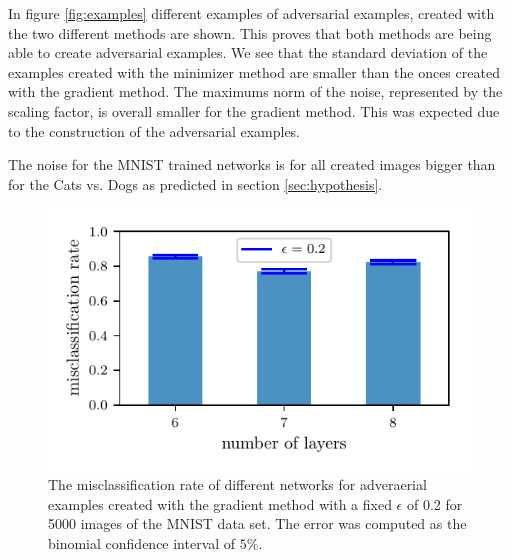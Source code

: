 \documentclass[%
 reprint,
 amsmath,amssymb,
 aps,
]{revtex4-1}
\begin{document}
In figure \ref{fig:examples} different examples of adversarial examples, created with the two different methods are shown. This proves that both methods are being able to create adversarial examples. We see that the standard deviation of the examples created with the minimizer method are smaller than the onces created with the gradient method. The maximums norm of the noise, represented by the scaling factor, is overall smaller for the gradient method. This was expected due to the construction of the adversarial examples.

The noise for the MNIST trained networks is for all created images bigger than for the Cats vs. Dogs as predicted in section \ref{sec:hypothesis}.  

\begin{figure}
\centering
\showthe\columnwidth
\includegraphics[width = 1\linewidth]{figures/mnist_grad_misclassificationrate.pdf}
\caption{The misclassification rate of different networks for adveraerial examples created with the gradient method with a fixed $\epsilon$ of 0.2 for 5000 images of the MNIST data set. The error was computed as the binomial confidence interval of $5\%$.}
\label{fig:comp_grad_mnist}
\end{figure}
\end{document}
